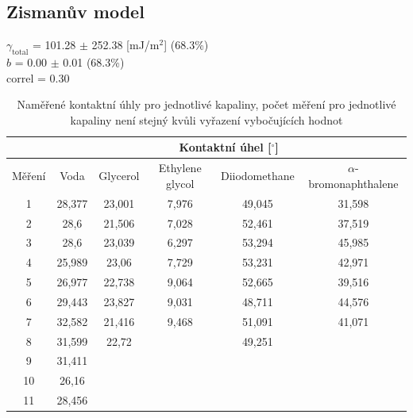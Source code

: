 \documentclass[12pt]{article}
\begin{document}
\subsection{Zismanův model}
\begin{centering}
   $\gamma_\mathrm{total}$      =            101.28 $\pm$ 252.38 [mJ/m$^2$] (68.3\%)\\
    $b$         =         0.00 $\pm$ 0.01 (68.3\%)\\
    correl     =              0.30\\
\end{centering}


\begin{table}[htbp]
\begin{center}
\begin{tabular}{|c|c|c|c|c|c|}
\hline
\multicolumn{1}{|l|}{} & \multicolumn{5}{|c|}{Kontaktní úhel [$^\circ$]}  \\ \hline
Měření & Voda & Glycerol & Ethylene glycol & Diiodomethane & $\alpha$-bromonaphthalene \\ \hline \hline
1 & 28,377 & 23,001 & 7,976 & 49,045 & 31,598 \\ \hline
2 & 28,6 & 21,506 & 7,028 & 52,461 & 37,519 \\ \hline
3 & 28,6 & 23,039 & 6,297 & 53,294 & 45,985 \\ \hline
4 & 25,989 & 23,06 & 7,729 & 53,231 & 42,971 \\ \hline
5 & 26,977 & 22,738 & 9,064 & 52,665 & 39,516 \\ \hline
6 & 29,443 & 23,827 & 9,031 & 48,711 & 44,576 \\ \hline
7 & 32,582 & 21,416 & 9,468 & 51,091 & 41,071 \\ \hline
8 & 31,599 & 22,72 &  & 49,251 &  \\ \hline
9 & 31,411 &  &  &  &  \\ \hline
10 & 26,16 &  &  &  &  \\ \hline
11 & 28,456 &  &  &  &  \\ \hline
\end{tabular}
\caption{Naměřené kontaktní úhly pro jednotlivé kapaliny, počet měření pro jednotlivé kapaliny není stejný kvůli vyřazení vybočujících hodnot}
\label{uhly}
\end{center}
\end{table}
\end{document}
